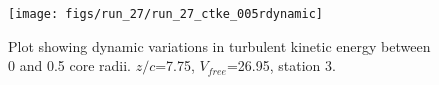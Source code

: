 \begin{figure}[H]
\centering
\texttt{[image: figs/run\_27/run\_27\_ctke\_005rdynamic]}
\caption{Plot showing dynamic variations in turbulent kinetic energy between 0 and 0.5 core radii. $z/c$=7.75, $V_{free}$=26.95, station 3.}
\label{fig:run_27_ctke_005rdynamic}
\end{figure}


